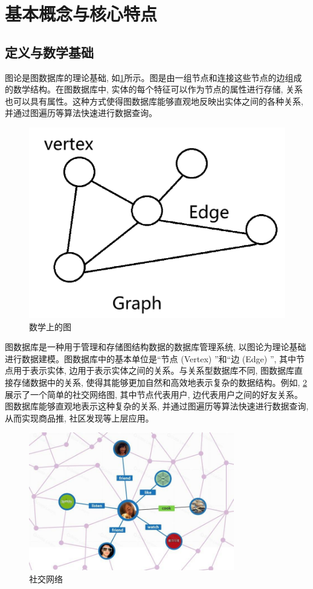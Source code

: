 \section{基本概念与核心特点}

\subsection{定义与数学基础}
图论是图数据库的理论基础, 如\cref{fig:graph}所示。图是由一组节点和连接这些节点的边组成的数学结构。在图数据库中, 实体的每个特征可以作为节点的属性进行存储, 关系也可以具有属性。这种方式使得图数据库能够直观地反映出实体之间的各种关系, 并通过图遍历等算法快速进行数据查询。

\begin{figure}[H]
	\centering
	\includegraphics[width=1\textwidth]{images/7.png}
	\caption{数学上的图}
	\label{fig:graph}
\end{figure}
图数据库是一种用于管理和存储图结构数据的数据库管理系统, 以图论为理论基础进行数据建模。图数据库中的基本单位是“节点 (Vertex) ”和“边 (Edge) ”, 其中节点用于表示实体, 边用于表示实体之间的关系。与关系型数据库不同, 图数据库直接存储数据中的关系, 使得其能够更加自然和高效地表示复杂的数据结构。例如, \cref{fig:social-network}展示了一个简单的社交网络图, 其中节点代表用户, 边代表用户之间的好友关系。图数据库能够直观地表示这种复杂的关系, 并通过图遍历等算法快速进行数据查询, 从而实现商品推, 社区发现等上层应用。
\begin{figure}[H]
	\centering
	\includegraphics[width=0.8\textwidth]{images/8.png}
	\caption{社交网络}
	\label{fig:social-network}
\end{figure}


